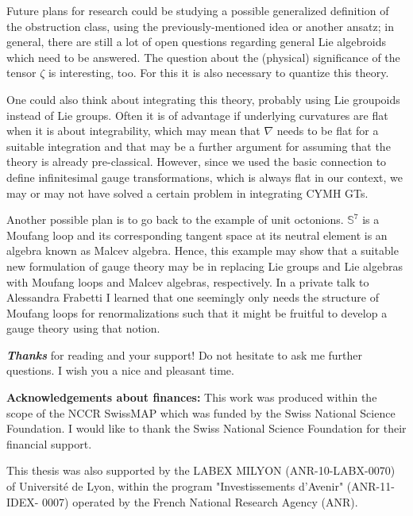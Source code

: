 
Future plans for research could be studying a possible generalized definition of the obstruction class, using the previously-mentioned idea or another ansatz; in general, there are still a lot of open questions regarding general Lie algebroids which need to be answered. The question about the (physical) significance of the tensor $\zeta$ is interesting, too. For this it is also necessary to quantize this theory.

One could also think about integrating this theory, probably using Lie groupoids instead of Lie groups. Often it is of advantage if underlying curvatures are flat when it is about integrability, which may mean that $\nabla$ needs to be flat for a suitable integration and that may be a further argument for assuming that the theory is already pre-classical. However, since we used the basic connection to define infinitesimal gauge transformations, which is always flat in our context, we may or may not have solved a certain problem in integrating CYMH GTs.

Another possible plan is to go back to the example of unit octonions. $\mathbb{S}^7$ is a Moufang loop and its corresponding tangent space at its neutral element is an algebra known as Malcev algebra. Hence, this example may show that a suitable new formulation of gauge theory may be in replacing Lie groups and Lie algebras with Moufang loops and Malcev algebras, respectively. In a private talk to Alessandra Frabetti I learned that one seemingly only needs the structure of Moufang loops for renormalizations such that it might be fruitful to develop a gauge theory using that notion.

\textbf{\emph{Thanks}} for reading and your support! Do not hesitate to ask me further questions. I wish you a nice and pleasant time.

\textbf{Acknowledgements about finances:} This work was produced within the scope of the NCCR SwissMAP which was funded by the Swiss National Science Foundation. I would like to thank the Swiss National Science Foundation for their financial support.

This thesis was also supported by the LABEX MILYON (ANR-10-LABX-0070) of Universit\'{e} de Lyon, within the program "Investissements d'Avenir" (ANR-11-IDEX- 0007) operated by the French National Research Agency (ANR).
